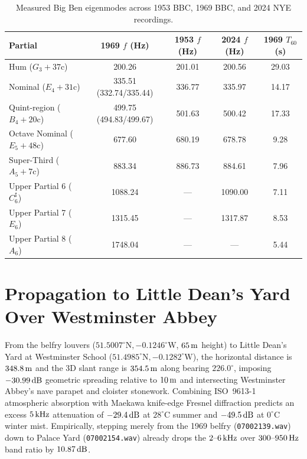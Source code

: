 \documentclass[11pt,a4paper]{article}
\begin{document}
\begin{table}[h!]
\centering
\caption{Measured Big Ben eigenmodes across 1953 BBC, 1969 BBC, and 2024 NYE recordings.}
\label{tab:bbmodes}
\begin{tabular}{lcccc}
\toprule
Partial & 1969 $f$ (Hz) & 1953 $f$ (Hz) & 2024 $f$ (Hz) & 1969 $T_{60}$ (s) \\
\midrule
Hum ($G_3 +37\text{c}$) & 200.26 & 201.01 & 200.56 & 29.03 \\
Nominal ($E_4 +31\text{c}$) & 335.51 (332.74/335.44) & 336.77 & 335.97 & 14.17 \\
Quint-region ($B_4 +20\text{c}$) & 499.75 (494.83/499.67) & 501.63 & 500.42 & 17.33 \\
Octave Nominal ($E_5 +48\text{c}$) & 677.60 & 680.19 & 678.78 & 9.28 \\
Super-Third ($A_5 +7\text{c}$) & 883.34 & 886.73 & 884.61 & 7.96 \\
Upper Partial 6 ($C^\sharp_6$) & 1088.24 & --- & 1090.00 & 7.11 \\
Upper Partial 7 ($E_6$) & 1315.45 & --- & 1317.87 & 8.53 \\
Upper Partial 8 ($A_6$) & 1748.04 & --- & --- & 5.44 \\
\bottomrule
\end{tabular}
\end{table}

\section{Propagation to Little Dean's Yard Over Westminster Abbey}
From the belfry louvers ($51.5007^\circ\text{N}, -0.1246^\circ\text{W}$, $65\text{\,m}$ height) to Little Dean's Yard at Westminster School ($51.4985^\circ\text{N}, -0.1282^\circ\text{W}$), the horizontal distance is $348.8\text{\,m}$ and the 3D slant range is $354.5\text{\,m}$ along bearing $226.0^\circ$, imposing $-30.99\text{\,dB}$ geometric spreading relative to $10\text{\,m}$ and intersecting Westminster Abbey's nave parapet and cloister stonework. Combining ISO~9613-1 atmospheric absorption with Maekawa knife-edge Fresnel diffraction predicts an excess $5\text{\,kHz}$ attenuation of $-29.4\text{\,dB}$ at $28^\circ\text{C}$ summer and $-49.5\text{\,dB}$ at $0^\circ\text{C}$ winter mist. Empirically, stepping merely from the 1969 belfry (\texttt{07002139.wav}) down to Palace Yard (\texttt{07002154.wav}) already drops the $2\text{--}6\text{\,kHz}$ over $300\text{--}950\text{\,Hz}$ band ratio by $10.87\text{\,dB}$.
\end{document}

